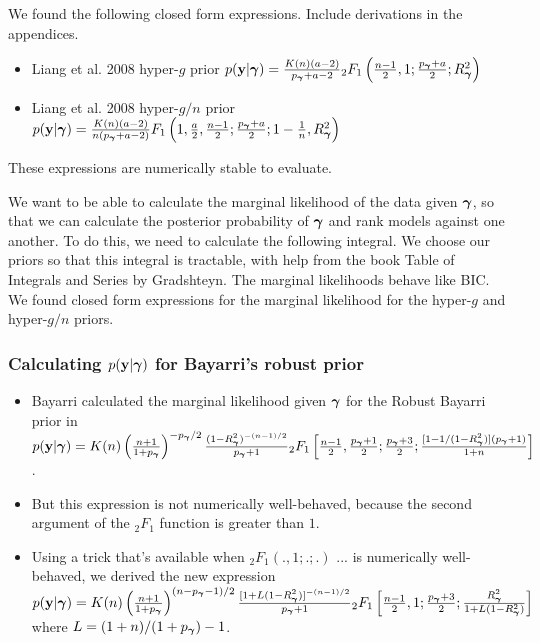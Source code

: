 We found the following closed form expressions. Include derivations in the appendices.
\small
\begin{itemize}
	\item Liang et al. 2008 hyper-$g$ prior \cite{Liang2008}
		$p({\bf y} | {\boldsymbol \gamma}) = \frac{K(n) (a - 2)}{p_{\boldsymbol \gamma} + a  - 2} {}_2 F_1 \left( \frac{n-1}{2}, 1; \frac{p_{\boldsymbol \gamma} + a}{2}; R_{\boldsymbol \gamma}^2 \right)$
	\item Liang et al. 2008 hyper-$g/n$ prior \cite{Liang2008}
		$p({\bf y} | {\boldsymbol \gamma}) = \frac{K(n) (a - 2)}{n (p_{\boldsymbol \gamma} + a  - 2)} F_1 \left( 1, \frac{a}{2}, \frac{n-1}{2}; \frac{p_{\boldsymbol \gamma} + a}{2}; 1 - \frac{1}{n}, R_{\boldsymbol \gamma}^2 \right)$
\end{itemize}
These expressions are numerically stable to evaluate.

We want to be able to calculate the marginal likelihood of the data given ${\boldsymbol \gamma}$, so that we can
calculate the posterior probability of ${\boldsymbol \gamma}$ and rank models against one another. To do this, we
need to calculate the following integral.
We choose our priors so that this integral is tractable, with help from the book Table of Integrals and
Series by Gradshteyn. The marginal likelihoods behave like BIC.
We found closed form expressions for the marginal likelihood for the hyper-$g$ and hyper-$g/n$ priors.

\subsubsection{Calculating $p({\bf y} | {\boldsymbol \gamma})$ for Bayarri's robust prior}
\begin{itemize}
	\item Bayarri calculated the marginal likelihood given ${\boldsymbol \gamma}$ for the Robust Bayarri prior
	 	in \cite{Bayarri2012} 
		\tiny
		$p({\bf y} | {\boldsymbol \gamma}) = K(n) \left(\frac{n + 1}{1 + p_{\boldsymbol \gamma}}\right)^{-p_{\boldsymbol \gamma}/2} \frac{(1 - R^2_{\boldsymbol \gamma})^{-(n-1)/2}}{p_{\boldsymbol \gamma} + 1} {}_2 F_1 \left[ \frac{n-1}{2}, \frac{p_{\boldsymbol \gamma}+1}{2}; \frac{p_{\boldsymbol \gamma} + 3}{2}; \frac{[1 - 1/(1 - R^2_{\boldsymbol \gamma})](p_{\boldsymbol \gamma} + 1)}{1 + n} \right]$.
	\small
	\item But this expression is not numerically well-behaved, because the second argument of the
				${}_2 F_1$ function is greater than $1$.
	\item Using a trick that's available when ${}_2 F_1(., 1; .; .)$ ... is numerically
				well-behaved, we derived the new expression
		\tiny
		$p({\bf y} | {\boldsymbol \gamma}) = K(n) \left(\frac{n + 1}{1 + p_{\boldsymbol \gamma}}\right)^{(n-p_{\boldsymbol \gamma}-1)/2} \frac{[1 + L (1 - R^2_{\boldsymbol \gamma})]^{-(n-1)/2}}{p_{\boldsymbol \gamma} + 1} {}_2 F_1 \left[ \frac{n-1}{2}, 1; \frac{p_{\boldsymbol \gamma} + 3}{2}; 
		\frac{R^2_{\boldsymbol \gamma}}{1 + L(1 - R^2_{\boldsymbol \gamma})} \right]$ \\
		\small
		where $L = (1 + n)/(1 + p_{\boldsymbol \gamma}) - 1$.
\end{itemize}

